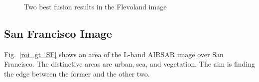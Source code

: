 \documentclass[journal]{IEEEtran}
\begin{document}
\begin{figure}[hbt]
	\centering
	\caption{Two best fusion results in the Flevoland image}
	\label{fusion_flev_met}
\end{figure}


\subsection{San Francisco Image}

Fig.~\ref{roi_gt_SF} shows an area of the L-band AIRSAR image over San Francisco.
The distinctive areas are urban, sea, and vegetation.
The aim is finding the edge between the former and the other two.
\end{document}
